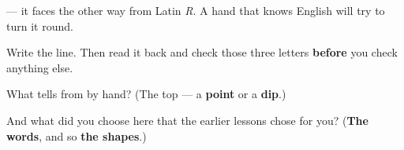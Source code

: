 \textbf{} — it faces the other way from Latin \emph{R}. A hand that knows English will try to turn it round.

Write the line. Then read it back and check those three letters \textbf{before} you check anything else.

\begin{tcolorbox}[breakable,colback=teal!4,colframe=teal!35!black,title={Before you move on}]
What tells \textbf{} from \textbf{} by hand? (The top — a \textbf{point} or a \textbf{dip}.)

And what did you choose here that the earlier lessons chose for you? (\textbf{The words}, and so \textbf{the shapes}.)
\end{tcolorbox}
